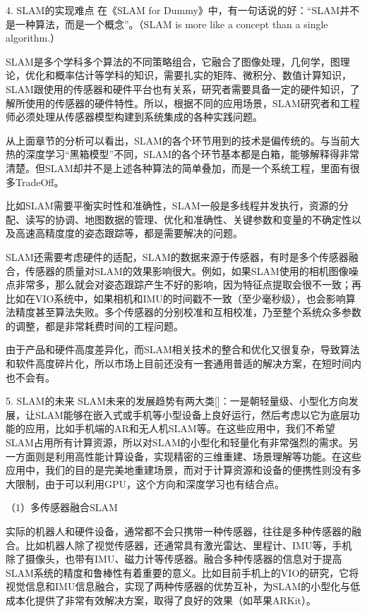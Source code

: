 4. SLAM的实现难点
在《SLAM for Dummy》中，有一句话说的好：“SLAM并不是一种算法，而是一个概念”。（SLAM is more like a concept than a single algorithm.）

SLAM是多个学科多个算法的不同策略组合，它融合了图像处理，几何学，图理论，优化和概率估计等学科的知识，需要扎实的矩阵、微积分、数值计算知识，SLAM跟使用的传感器和硬件平台也有关系，研究者需要具备一定的硬件知识，了解所使用的传感器的硬件特性。所以，根据不同的应用场景，SLAM研究者和工程师必须处理从传感器模型构建到系统集成的各种实践问题。

从上面章节的分析可以看出，SLAM的各个环节用到的技术是偏传统的。与当前大热的深度学习“黑箱模型”不同，SLAM的各个环节基本都是白箱，能够解释得非常清楚。但SLAM却并不是上述各种算法的简单叠加，而是一个系统工程，里面有很多TradeOff。

比如SLAM需要平衡实时性和准确性，SLAM一般是多线程并发执行，资源的分配、读写的协调、地图数据的管理、优化和准确性、关键参数和变量的不确定性以及高速高精度度的姿态跟踪等，都是需要解决的问题。

SLAM还需要考虑硬件的适配，SLAM的数据来源于传感器，有时是多个传感器融合，传感器的质量对SLAM的效果影响很大。例如，如果SLAM使用的相机图像噪点非常多，那么就会对姿态跟踪产生不好的影响，因为特征点提取会很不一致；再比如在VIO系统中，如果相机和IMU的时间戳不一致（至少毫秒级），也会影响算法精度甚至算法失败。多个传感器的分别校准和互相校准，乃至整个系统众多参数的调整，都是非常耗费时间的工程问题。

由于产品和硬件高度差异化，而SLAM相关技术的整合和优化又很复杂，导致算法和软件高度碎片化，所以市场上目前还没有一套通用普适的解决方案，在短时间内也不会有。

5. SLAM的未来
SLAM未来的发展趋势有两大类[]：一是朝轻量级、小型化方向发展，让SLAM能够在嵌入式或手机等小型设备上良好运行，然后考虑以它为底层功能的应用，比如手机端的AR和无人机SLAM等。在这些应用中，我们不希望SLAM占用所有计算资源，所以对SLAM的小型化和轻量化有非常强烈的需求。另一方面则是利用高性能计算设备，实现精密的三维重建、场景理解等功能。在这些应用中，我们的目的是完美地重建场景，而对于计算资源和设备的便携性则没有多大限制，由于可以利用GPU，这个方向和深度学习也有结合点。

（1）多传感器融合SLAM

实际的机器人和硬件设备，通常都不会只携带一种传感器，往往是多种传感器的融合。比如机器人除了视觉传感器，还通常具有激光雷达、里程计、IMU等，手机除了摄像头，也带有IMU、磁力计等传感器。融合多种传感器的信息对于提高SLAM系统的精度和鲁棒性有着重要的意义。比如目前手机上的VIO的研究，它将视觉信息和IMU信息融合，实现了两种传感器的优势互补，为SLAM的小型化与低成本化提供了非常有效解决方案，取得了良好的效果（如苹果ARKit）。

